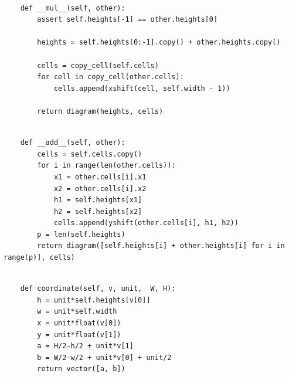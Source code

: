 \documentclass{book}
\newcounter{pcounter}
\begin{document}
\begin{center}
\begin{tcolorbox}[width=5in,colback={white},title={\begin{center}\texttt{Python \thepcounter} \addtocounter{pcounter}{1}  \end{center}},colbacktitle=Red,coltitle=black]
\begin{verbatim}

    def __mul__(self, other):
        assert self.heights[-1] == other.heights[0]

        heights = self.heights[0:-1].copy() + other.heights.copy()

        cells = copy_cell(self.cells)
        for cell in copy_cell(other.cells):
            cells.append(xshift(cell, self.width - 1))

        return diagram(heights, cells)

\end{verbatim}%
\end{tcolorbox}
\end{center}

\begin{center}
\begin{tcolorbox}[width=5in,colback={white},title={\begin{center}\texttt{Python \thepcounter} \addtocounter{pcounter}{1}  \end{center}},colbacktitle=Red,coltitle=black]
\begin{verbatim}

    def __add__(self, other):
        cells = self.cells.copy()
        for i in range(len(other.cells)):
            x1 = other.cells[i].x1
            x2 = other.cells[i].x2
            h1 = self.heights[x1]
            h2 = self.heights[x2]
            cells.append(yshift(other.cells[i], h1, h2))
        p = len(self.heights)
        return diagram([self.heights[i] + other.heights[i] for i in range(p)], cells)

\end{verbatim}%
\end{tcolorbox}
\end{center}

\begin{center}
\begin{tcolorbox}[width=5in,colback={white},title={\begin{center}\texttt{Python \thepcounter} \addtocounter{pcounter}{1}  \end{center}},colbacktitle=Red,coltitle=black]
\begin{verbatim}

    def coordinate(self, v, unit,  W, H):
        h = unit*self.heights[v[0]]
        w = unit*self.width
        x = unit*float(v[0])
        y = unit*float(v[1])
        a = H/2-h/2 + unit*v[1]
        b = W/2-w/2 + unit*v[0] + unit/2
        return vector([a, b])

\end{verbatim}%
\end{tcolorbox}
\end{center}
\end{document}
